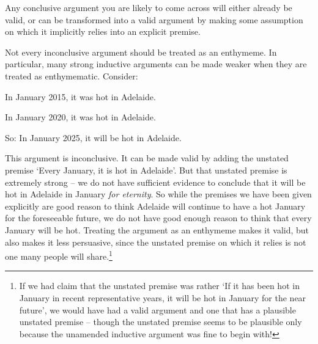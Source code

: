 	Any conclusive argument you are likely to come across will either already be valid, or can be transformed into a valid argument by making some assumption on which it implicitly relies into an explicit premise.

	Not every inconclusive argument should be treated as an enthymeme. In particular, many strong inductive arguments can be made weaker when they are treated as enthymematic. Consider:
	\begin{earg}
		\item[] In January 2015, it was hot in Adelaide.
		\item[] In January 2020, it was hot in Adelaide.
	\item[So:] In January 2025, it will be hot in Adelaide.
\end{earg} This argument is inconclusive. It can be made valid by adding the unstated premise `Every January, it is hot in Adelaide'. But that unstated premise is extremely strong – we do not have sufficient evidence to conclude that it will be hot in Adelaide in January \emph{for eternity}. So while the premises we have been given explicitly are good reason to think Adelaide will continue to have a hot January for the foreseeable future, we do not have good enough reason to think that every January will be hot. Treating the argument as an enthymeme makes it valid, but also makes it less persuasive, since the unstated premise on which it relies is not one many people will share.\footnote{If we had claim that the unstated premise was rather `If it has been hot in January in recent representative years, it will be hot in January for the near future', we would have had a valid argument and one that has a plausible unstated premise – though the unstated premise seems to be plausible only because the unamended inductive argument was fine to begin with!}


